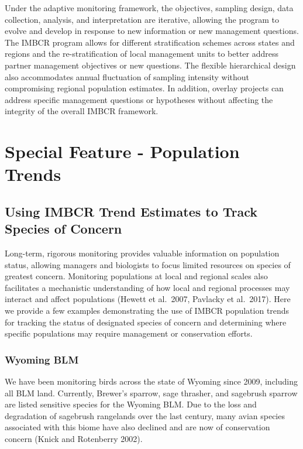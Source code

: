 \documentclass[
  letterpaper,
  DIV=11,
  numbers=noendperiod,
  oneside]{scrreprt}
\begin{document}
Under the adaptive monitoring framework, the objectives, sampling
design, data collection, analysis, and interpretation are iterative,
allowing the program to evolve and develop in response to new
information or new management questions. The IMBCR program allows for
different stratification schemes across states and regions and the
re-stratification of local management units to better address partner
management objectives or new questions. The flexible hierarchical design
also accommodates annual fluctuation of sampling intensity without
compromising regional population estimates. In addition, overlay
projects can address specific management questions or hypotheses without
affecting the integrity of the overall IMBCR framework.

\hypertarget{special-feature---population-trends}{%
\chapter{Special Feature - Population
Trends}\label{special-feature---population-trends}}

\hypertarget{using-imbcr-trend-estimates-to-track-species-of-concern}{%
\section{Using IMBCR Trend Estimates to Track Species of
Concern}\label{using-imbcr-trend-estimates-to-track-species-of-concern}}

Long-term, rigorous monitoring provides valuable information on
population status, allowing managers and biologists to focus limited
resources on species of greatest concern. Monitoring populations at
local and regional scales also facilitates a mechanistic understanding
of how local and regional processes may interact and affect populations
(Hewett et al.~2007, Pavlacky et al.~2017). Here we provide a few
examples demonstrating the use of IMBCR population trends for tracking
the status of designated species of concern and determining where
specific populations may require management or conservation efforts.

\hypertarget{wyoming-blm}{%
\subsection{Wyoming BLM}\label{wyoming-blm}}

We have been monitoring birds across the state of Wyoming since 2009,
including all BLM land. Currently, Brewer's sparrow, sage thrasher, and
sagebrush sparrow are listed sensitive species for the Wyoming BLM. Due
to the loss and degradation of sagebrush rangelands over the last
century, many avian species associated with this biome have also
declined and are now of conservation concern (Knick and Rotenberry
2002).
\end{document}
